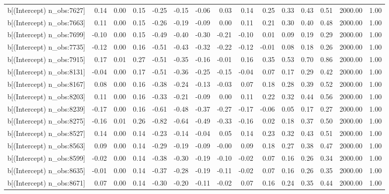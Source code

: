 \begin{table}[ht]
\begin{tabular}{rrrrrrrrrrrrrrr}
  b[(Intercept) n\_obs:7627] & 0.14 & 0.00 & 0.15 & -0.25 & -0.15 & -0.06 & 0.03 & 0.14 & 0.25 & 0.33 & 0.43 & 0.51 & 2000.00 & 1.00 \\ 
  b[(Intercept) n\_obs:7663] & 0.11 & 0.00 & 0.15 & -0.26 & -0.19 & -0.09 & 0.00 & 0.11 & 0.21 & 0.30 & 0.40 & 0.48 & 2000.00 & 1.00 \\ 
  b[(Intercept) n\_obs:7699] & -0.10 & 0.00 & 0.15 & -0.49 & -0.40 & -0.30 & -0.21 & -0.10 & 0.01 & 0.09 & 0.19 & 0.29 & 2000.00 & 1.00 \\ 
  b[(Intercept) n\_obs:7735] & -0.12 & 0.00 & 0.16 & -0.51 & -0.43 & -0.32 & -0.22 & -0.12 & -0.01 & 0.08 & 0.18 & 0.26 & 2000.00 & 1.00 \\ 
  b[(Intercept) n\_obs:7915] & 0.17 & 0.01 & 0.27 & -0.51 & -0.35 & -0.16 & -0.01 & 0.16 & 0.35 & 0.53 & 0.70 & 0.86 & 2000.00 & 1.00 \\ 
  b[(Intercept) n\_obs:8131] & -0.04 & 0.00 & 0.17 & -0.51 & -0.36 & -0.25 & -0.15 & -0.04 & 0.07 & 0.17 & 0.29 & 0.42 & 2000.00 & 1.00 \\ 
  b[(Intercept) n\_obs:8167] & 0.08 & 0.00 & 0.16 & -0.38 & -0.24 & -0.13 & -0.03 & 0.07 & 0.18 & 0.28 & 0.39 & 0.52 & 2000.00 & 1.00 \\ 
  b[(Intercept) n\_obs:8203] & 0.11 & 0.00 & 0.16 & -0.33 & -0.21 & -0.09 & 0.00 & 0.11 & 0.22 & 0.32 & 0.44 & 0.56 & 2000.00 & 1.00 \\ 
  b[(Intercept) n\_obs:8239] & -0.17 & 0.00 & 0.16 & -0.61 & -0.48 & -0.37 & -0.27 & -0.17 & -0.06 & 0.05 & 0.17 & 0.27 & 2000.00 & 1.00 \\ 
  b[(Intercept) n\_obs:8275] & -0.16 & 0.01 & 0.26 & -0.82 & -0.64 & -0.49 & -0.33 & -0.16 & 0.02 & 0.18 & 0.37 & 0.50 & 2000.00 & 1.00 \\ 
  b[(Intercept) n\_obs:8527] & 0.14 & 0.00 & 0.14 & -0.23 & -0.14 & -0.04 & 0.05 & 0.14 & 0.23 & 0.32 & 0.43 & 0.51 & 2000.00 & 1.00 \\ 
  b[(Intercept) n\_obs:8563] & 0.09 & 0.00 & 0.14 & -0.29 & -0.19 & -0.09 & -0.00 & 0.09 & 0.18 & 0.27 & 0.38 & 0.47 & 2000.00 & 1.00 \\ 
  b[(Intercept) n\_obs:8599] & -0.02 & 0.00 & 0.14 & -0.38 & -0.30 & -0.19 & -0.10 & -0.02 & 0.07 & 0.16 & 0.26 & 0.34 & 2000.00 & 1.00 \\ 
  b[(Intercept) n\_obs:8635] & -0.01 & 0.00 & 0.14 & -0.37 & -0.28 & -0.19 & -0.11 & -0.02 & 0.07 & 0.16 & 0.26 & 0.35 & 2000.00 & 1.00 \\ 
  b[(Intercept) n\_obs:8671] & 0.07 & 0.00 & 0.14 & -0.30 & -0.20 & -0.11 & -0.02 & 0.07 & 0.16 & 0.24 & 0.35 & 0.44 & 2000.00 & 1.00 \\ 

\end{tabular}
\end{table}
